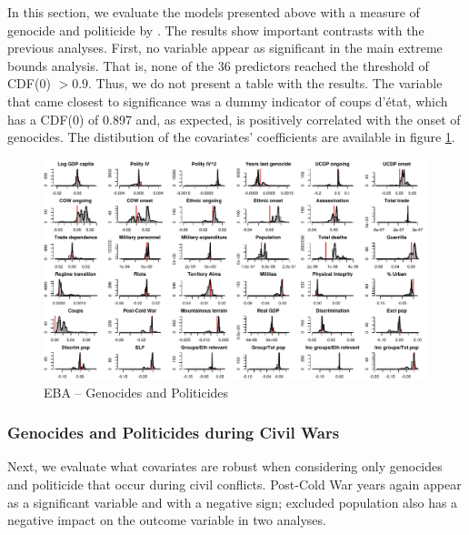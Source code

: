 \documentclass[a4paper,12pt]{article}
\begin{document}
In this section, we evaluate the models presented above with a measure of genocide and politicide by \citet{harff2003no}. The results show important contrasts with the previous analyses. First, no variable appear as significant in the main extreme bounds analysis. That is, none of the 36 predictors reached the threshold of CDF(0) $> 0.9$. Thus, we do not present a table with the results. The variable that came closest to significance was a dummy indicator of coups d'état, which has a CDF(0) of 0.897 and, as expected, is positively correlated with the onset of genocides. The distibution of the covariates' coefficients are available in figure \ref{fig:uamk}.

\newpage 

\begin{figure}
    \centering
    \includegraphics[width=.98\textheight,angle=90]{images/uamk.pdf}
    \caption{EBA -- Genocides and Politicides}
    \label{fig:uamk}
\end{figure}

\subsubsection{Genocides and Politicides during Civil Wars}

Next, we evaluate what covariates are robust when considering only genocides and politicide that occur during civil conflicts. Post-Cold War years again appear as a significant variable and with a negative sign; excluded population also has a negative impact on the outcome variable in two analyses.

\vspace{1cm}
\end{document}
